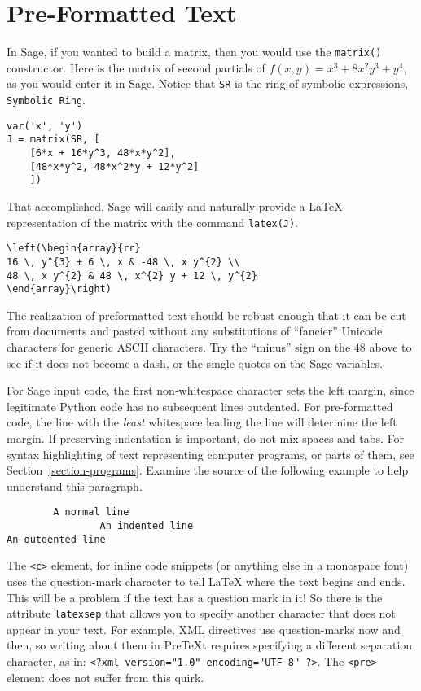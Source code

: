 \documentclass[10pt,]{article}
\theoremstyle{plain}
\theoremstyle{definition}
\theoremstyle{definition}
\theoremstyle{definition}
\theoremstyle{definition}
\theoremstyle{definition}
\theoremstyle{definition}
\numberwithin{equation}{section}
\begin{document}
\section[{Pre-Formatted Text}]{Pre-Formatted Text}\label{section-18}
\hypertarget{p-610}{}%
In Sage, if you wanted to build a matrix, then you would use the \lstinline?matrix()? constructor.  Here is the matrix of second partials of \(f(x,y)=x^3+8x^2y^3 + y^4\), as you would enter it in Sage.  Notice that \lstinline?SR? is the ring of symbolic expressions, \lstinline?Symbolic Ring?.%
\begin{verbatim}
var('x', 'y')
J = matrix(SR, [
    [6*x + 16*y^3, 48*x*y^2],
    [48*x*y^2, 48*x^2*y + 12*y^2]
    ])
\end{verbatim}
\hypertarget{p-611}{}%
That accomplished, Sage will easily and naturally provide a \LaTeX{} representation of the matrix with the command \lstinline?latex(J)?.%
\begin{verbatim}
\left(\begin{array}{rr}
16 \, y^{3} + 6 \, x & -48 \, x y^{2} \\
48 \, x y^{2} & 48 \, x^{2} y + 12 \, y^{2}
\end{array}\right)
\end{verbatim}
\hypertarget{p-612}{}%
The realization of preformatted text should be robust enough that it can be cut from documents and pasted without any substitutions of ``fancier'' Unicode characters for generic ASCII characters.  Try the ``minus'' sign on the \(48\) above to see if it does not become a dash, or the single quotes on the Sage variables.%
\par
\hypertarget{p-613}{}%
For Sage input code, the first non-whitespace character sets the left margin, since legitimate Python code has no subsequent lines outdented.  For pre-formatted code, the line with the \emph{least} whitespace leading the line will determine the left margin.  If preserving indentation is important, do not mix spaces and tabs.  For syntax highlighting of text representing computer programs, or parts of them, see Section~\hyperref[section-programs]{\ref{section-programs}}.  Examine the source of the following example to help understand this paragraph.%
\begin{verbatim}
        A normal line
                An indented line
An outdented line
\end{verbatim}
\hypertarget{p-614}{}%
The \lstinline?<c>? element, for inline code snippets (or anything else in a monospace font) uses the question-mark character to tell \LaTeX{} where the text begins and ends.  This will be a problem if the text has a question mark in it!  So there is the attribute \lstinline?latexsep? that allows you to specify another character that does not appear in your text.  For example, XML directives use question-marks now and then, so writing about them in PreTeXt requires specifying a different separation character, as in:  \lstinline!<?xml version="1.0" encoding="UTF-8" ?>!.  The \lstinline?<pre>? element does not suffer from this quirk.%
\end{document}
